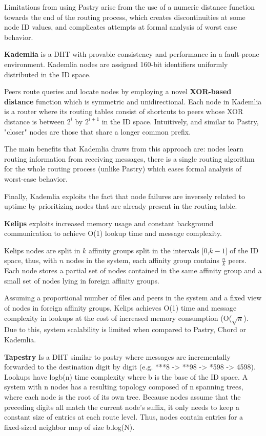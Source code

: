 Limitations from using Pastry arise from the use of a numeric distance function towards the end of the routing process, which creates discontinuities at some node ID values, and complicates attempts at formal analysis of worst case behavior.

\textbf{Kademlia} \cite{10.1007/3-540-45748-8_5} is a DHT with provable consistency and performance in a fault-prone environment. Kademlia nodes are assigned 160-bit identifiers uniformly distributed in the ID space.

Peers route queries and locate nodes by employing a novel \textbf{XOR-based distance} function which is symmetric and unidirectional. Each node in Kademlia is a router where its routing tables consist of shortcuts to peers whose XOR distance is between \(2^{i}\) by \(2^{i + 1}\) in the ID space. Intuitively, and similar to Pastry, "closer" nodes are those that share a longer common prefix.

The main benefits that Kademlia draws from this approach are: nodes learn routing information from receiving messages, there is a single routing algorithm for the whole routing process (unlike Pastry) which eases formal analysis of worst-case behavior. 

Finally, Kademlia exploits the fact that node failures are inversely related to uptime by prioritizing nodes that are already present in the routing table.

\textbf{Kelips} \cite{gupta2003kelips} exploits increased memory usage and constant background communication to achieve O(1) lookup time and message complexity. 

Kelips nodes are split in $k$ affinity groups split in the intervals [0,$k-1$] of the ID space, thus, with $n$ nodes in the system, each affinity group contains $\frac{n}{k}$ peers.  Each node stores a partial set of nodes contained in the same affinity group and a small set of nodes lying in foreign affinity groups.

Assuming a proportional number of files and peers in the system and a fixed view of nodes in foreign affinity groups, Kelips achieves O(1) time and message complexity in lookups at the cost of increased memory consumption (O($\sqrt{n}$). Due to this, system scalability is limited when compared to Pastry, Chord or Kademlia. 

\textbf{Tapestry} \cite{tapestry} Is a DHT similar to pastry where messages are incrementally forwarded to the destination digit by digit (e.g. ***8 -> **98 -> *598 -> 4598). Lookups have logb(n) time complexity where b is the base of the ID space. A system with n nodes has a resulting topology composed of n spanning trees, where each node is the root of its own tree. Because nodes assume that the preceding digits all match the current node's suffix, it only needs to keep a constant size of entries at each route level. Thus, nodes contain entries for a fixed-sized neighbor map of size b.log(N). 

